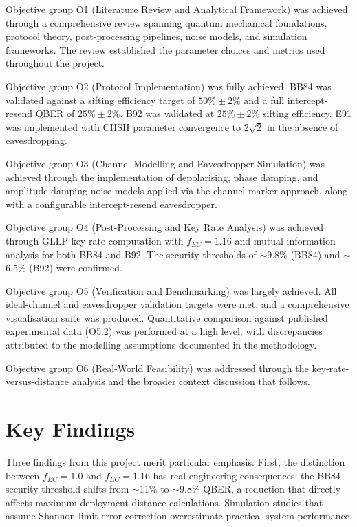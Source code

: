 \documentclass[10pt, a4paper]{report}
\begin{document}
Objective group O1 (Literature Review and Analytical Framework) was achieved through a comprehensive review spanning quantum mechanical foundations, protocol theory, post-processing pipelines, noise models, and simulation frameworks. The review established the parameter choices and metrics used throughout the project.

Objective group O2 (Protocol Implementation) was fully achieved. BB84 was validated against a sifting efficiency target of $50\% \pm 2\%$ and a full intercept-resend QBER of $25\% \pm 2\%$. B92 was validated at $25\% \pm 2\%$ sifting efficiency. E91 was implemented with CHSH parameter convergence to $2\sqrt{2}$ in the absence of eavesdropping.

Objective group O3 (Channel Modelling and Eavesdropper Simulation) was achieved through the implementation of depolarising, phase damping, and amplitude damping noise models applied via the channel-marker approach, along with a configurable intercept-resend eavesdropper.

Objective group O4 (Post-Processing and Key Rate Analysis) was achieved through GLLP key rate computation with $f_{EC} = 1.16$ and mutual information analysis for both BB84 and B92. The security thresholds of $\sim$9.8\% (BB84) and $\sim$6.5\% (B92) were confirmed.

Objective group O5 (Verification and Benchmarking) was largely achieved. All ideal-channel and eavesdropper validation targets were met, and a comprehensive visualisation suite was produced. Quantitative comparison against published experimental data (O5.2) was performed at a high level, with discrepancies attributed to the modelling assumptions documented in the methodology.

Objective group O6 (Real-World Feasibility) was addressed through the key-rate-versus-distance analysis and the broader context discussion that follows.




\section{Key Findings}

Three findings from this project merit particular emphasis. First, the distinction between $f_{EC} = 1.0$ and $f_{EC} = 1.16$ has real engineering consequences: the BB84 security threshold shifts from $\sim$11\% to $\sim$9.8\% QBER, a reduction that directly affects maximum deployment distance calculations. Simulation studies that assume Shannon-limit error correction overestimate practical system performance.
\end{document}

